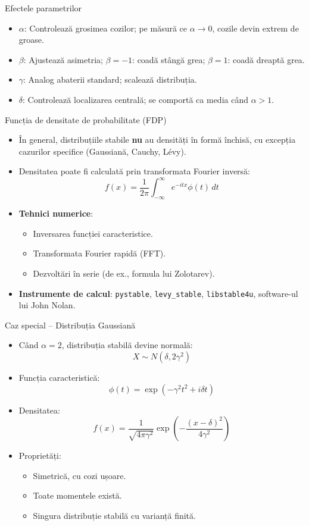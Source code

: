 \documentclass[9pt, aspectratio=169, t]{beamer}
\theoremstyle{definition}
\begin{document}
\begin{frame}{Efectele parametrilor}
\begin{itemize}
    \item $\alpha$: Controlează grosimea cozilor; pe măsură ce $\alpha \to 0$, cozile devin extrem de groase.
    \item $\beta$: Ajustează asimetria; $\beta = -1$: coadă stângă grea; $\beta = 1$: coadă dreaptă grea.
    \item $\gamma$: Analog abaterii standard; scalează distribuția.
    \item $\delta$: Controlează localizarea centrală; se comportă ca media când $\alpha > 1$.
\end{itemize}
\end{frame}

\begin{frame}{Funcția de densitate de probabilitate (FDP)}
\begin{itemize}
    \item În general, distribuțiile stabile \textbf{nu} au densități în formă închisă, cu excepția cazurilor specifice (Gaussiană, Cauchy, L\'{e}vy).
    \item Densitatea poate fi calculată prin transformata Fourier inversă:
    \[
        f(x) = \frac{1}{2\pi}\int_{-\infty}^{\infty} e^{-itx}\phi(t)\,dt
    \]
    \item \textbf{Tehnici numerice}:
    \begin{itemize}
        \item Inversarea funcției caracteristice.
        \item Transformata Fourier rapidă (FFT).
        \item Dezvoltări în serie (de ex., formula lui Zolotarev).
    \end{itemize}
    \item \textbf{Instrumente de calcul}: \texttt{pystable}, \texttt{levy\_stable}, \texttt{libstable4u}, software-ul lui John Nolan.
\end{itemize}
\end{frame}

\begin{frame}{Caz special -- Distribuția Gaussiană}
\begin{itemize}
    \item Când $\alpha = 2$, distribuția stabilă devine normală:
    \[
        X \sim N(\delta, 2\gamma^2)
    \]
    \item Funcția caracteristică:
    \[
        \phi(t) = \exp(-\gamma^2 t^2 + i\delta t)
    \]
    \item Densitatea:
    \[
        f(x) = \frac{1}{\sqrt{4\pi\gamma^2}}\exp\left(-\frac{(x-\delta)^2}{4\gamma^2}\right)
    \]
    \item Proprietăți:
    \begin{itemize}
        \item Simetrică, cu cozi ușoare.
        \item Toate momentele există.
        \item Singura distribuție stabilă cu varianță finită.
    \end{itemize}
\end{itemize}
\end{frame}
\end{document}

